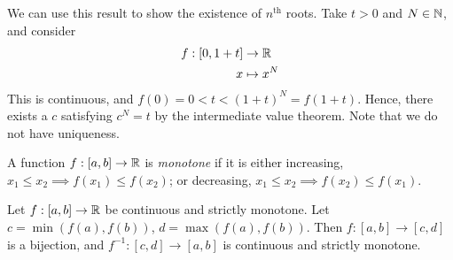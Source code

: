 \documentclass{../template/note}
\begin{document}
    \begin{example*}
        We can use this result to show the existence of \(n^\text{th}\) roots. Take \(t > 0\) and \(N \in \mathbb N\), and consider
        \begin{align*}
            f: [0, 1 + t] &\to \mathbb R \\
            x &\mapsto x^N
        \end{align*}
        This is continuous, and \(f(0) = 0 < t < (1+t)^N = f(1+t)\). Hence, there exists a \(c\) satisfying \(c^N = t\) by the intermediate value theorem. Note that we do not have uniqueness.        
    \end{example*}
    
    \begin{definition}
        A function \(f: [a, b] \to \mathbb R\) is \emph{monotone} if it is either increasing, \(x_1 \leq x_2 \implies f(x_1) \leq f(x_2)\); or decreasing, \(x_1 \leq x_2 \implies f(x_2) \leq f(x_1)\).
    \end{definition}
    
    \begin{proposition}
        \label{ift-1}
        Let \(f: [a, b] \to \mathbb R\) be continuous and strictly monotone. Let \(c = \min(f(a), f(b))\), \(d = \max(f(a), f(b))\). Then \(f: [a, b] \to [c, d]\) is a bijection, and \(f^{-1}: [c, d] \to [a, b]\) is continuous and strictly monotone.
    \end{proposition}
\end{document}

